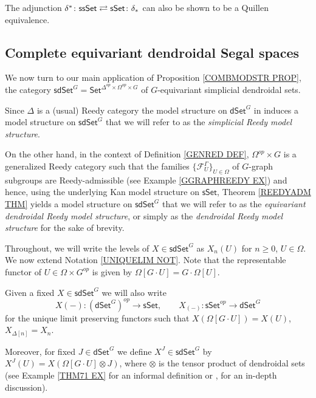 \documentclass[a4paper,10pt
]{article}%
\begin{document}
\begin{remark}
The adjunction 
$
	\delta^{\**}\colon \mathsf{ssSet}
		\rightleftarrows 
	\mathsf{sSet} \colon \delta_{\**}
$
can also be shown to be a Quillen equivalence.
\end{remark}


\subsection{Complete equivariant dendroidal Segal spaces}
\label{CEDSS SEC}


We now turn to our main application of Proposition \ref{COMBMODSTR PROP}, the category 
$\mathsf{sdSet}^G = \mathsf{Set}^{\Delta^{op} \times \Omega^{op} \times G}$
of $G$-equivariant simplicial dendroidal sets.

Since $\Delta$ is a (usual) Reedy category the model structure on $\mathsf{dSet}^G$ 
in \cite[Thm. 2.1]{Per17} induces 
a model structure on $\mathsf{sdSet}^G$
that we will refer to as the \textit{simplicial Reedy model structure}.

On the other hand, in the context of Definition \ref{GENRED DEF},
$\Omega^{op} \times G$ is a generalized Reedy category such that the families $\{\mathcal{F}_{U}^{\Gamma}\}_{U \in \Omega}$
of $G$-graph subgroups are Reedy-admissible 
(see Example \ref{GGRAPHREEDY EX})
and hence, using the underlying 
Kan model structure on $\mathsf{sSet}$, 
Theorem \ref{REEDYADM THM} yields
a model structure on $\mathsf{sdSet}^G$
that we will refer to as the \textit{equivariant dendroidal Reedy model structure}, 
or simply as the \textit{dendroidal Reedy model structure} for the sake of brevity.

Throughout, we will write the levels of 
$X \in \mathsf{sdSet}^G$ as 
$X_n(U)$ for $n\geq 0$, $U \in \Omega$.
We now extend Notation \ref{UNIQUELIM NOT}.
Note that the representable functor of
$U \in \Omega \times G^{op}$ is given by $\Omega[G \cdot U] = G \cdot \Omega[U]$.

\begin{notation}\label{UNILIMDEN NOT}
	Given a fixed $X \in \mathsf{sdSet}^G$ we will also write
\[
	X(-)\colon \left(\mathsf{dSet}^G \right)^{op} \to \mathsf{sSet},\qquad 
	X_{(-)} \colon \mathsf{sSet}^{op} \to \mathsf{dSet}^{G}
\]
	for the unique limit preserving functors such that
	$X(\Omega[G \cdot U]) = X(U)$, $X_{\Delta[n]} = X_n$.
	
	Moreover, for fixed 
	$J \in \mathsf{dSet}^{G}$ we define
	$X^J \in \mathsf{sdSet}^G$ by
	$X^J(U) = X\left(\Omega[G \cdot U] \otimes J 
	\right)$,
	where $\otimes$ is the tensor product of dendroidal sets (see Example \ref{THM71 EX} for an informal definition or \cite[\S 9]{MW09},\cite[\S 7]{Per17} for an in-depth discussion).
\end{notation}
\end{document}

